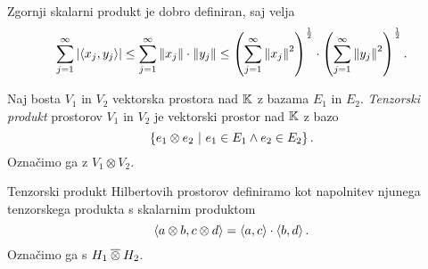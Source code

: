 \begin{opomba}
Zgornji skalarni produkt je dobro definiran, saj velja
\[
\sum_{j=1}^\infty \left\lvert \left\langle x_j,y_j\right\rangle\right\rvert \leq
\sum_{j=1}^\infty \left\lVert x_j\right\rVert \cdot \left\lVert y_j\right\rVert \leq
\left(\sum_{j=1}^\infty \left\lVert x_j\right\rVert^2\right)^\frac{1}{2} \cdot
\left(\sum_{j=1}^\infty \left\lVert y_j\right\rVert^2\right)^\frac{1}{2}.
\]
\end{opomba}

\begin{definicija}
Naj bosta $V_1$ in $V_2$ vektorska prostora nad $\mathbb{K}$ z bazama $E_1$
in $E_2$.
\emph{Tenzorski produkt}
prostorov $V_1$ in $V_2$ je vektorski prostor nad $\mathbb{K}$ z bazo
\[
\left\{e_1 \otimes e_2~\middle\vert~e_1 \in E_1 \land e_2 \in E_2\right\}.
\]
Označimo ga z $V_1 \otimes V_2$.
\end{definicija}

\begin{opomba}
Tenzorski produkt Hilbertovih prostorov definiramo kot napolnitev
njunega tenzorskega produkta s skalarnim produktom
\[
\left\langle a \otimes b, c \otimes d\right\rangle = \left\langle a,c\right\rangle \cdot \left\langle b,d\right\rangle.
\]
Označimo ga s $H_1 \mathbin{\overline{\otimes}} H_2$.
\end{opomba}
